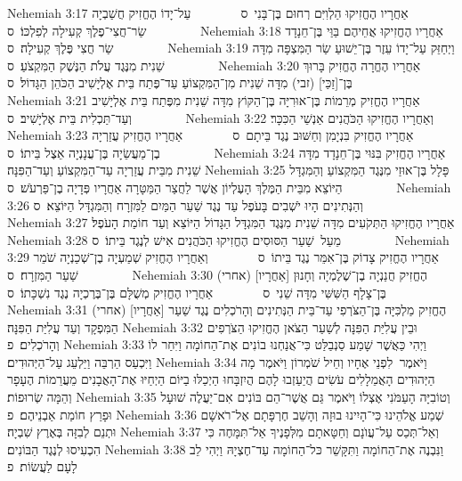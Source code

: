 Nehemiah 3:17	אַחֲרָיו הֶחֱזִיקוּ הַלְוִיִּם רְחוּם בֶּן־בָּנִי {ס}        עַל־יָדוֹ הֶחֱזִיק חֲשַׁבְיָה שַׂר־חֲצִי־פֶלֶךְ קְעִילָה לְפִלְכּוֹ׃ {ס}        
Nehemiah 3:18	אַחֲרָיו הֶחֱזִיקוּ אֲחֵיהֶם בַּוַּי בֶּן־חֵנָדָד שַׂר חֲצִי פֶּלֶךְ קְעִילָה׃ {ס}        
Nehemiah 3:19	וַיְחַזֵּק עַל־יָדוֹ עֵזֶר בֶּן־יֵשׁוּעַ שַׂר הַמִּצְפָּה מִדָּה שֵׁנִית מִנֶּגֶד עֲלֹת הַנֶּשֶׁק הַמִּקְצֹעַ׃ {ס}        
Nehemiah 3:20	אַחֲרָיו הֶחֱרָה הֶחֱזִיק בָּרוּךְ בֶּן־[זַכַּי] (זבי) מִדָּה שֵׁנִית מִן־הַמִּקְצוֹעַ עַד־פֶּתַח בֵּית אֶלְיָשִׁיב הַכֹּהֵן הַגָּדוֹל׃ {ס}        
Nehemiah 3:21	אַחֲרָיו הֶחֱזִיק מְרֵמוֹת בֶּן־אוּרִיָּה בֶּן־הַקּוֹץ מִדָּה שֵׁנִית מִפֶּתַח בֵּית אֶלְיָשִׁיב וְעַד־תַּכְלִית בֵּית אֶלְיָשִׁיב׃ {ס}        
Nehemiah 3:22	וְאַחֲרָיו הֶחֱזִיקוּ הַכֹּהֲנִים אַנְשֵׁי הַכִּכָּר׃
Nehemiah 3:23	אַחֲרָיו הֶחֱזִיק בִּנְיָמִן וְחַשּׁוּב נֶגֶד בֵּיתָם {ס}        אַחֲרָיו הֶחֱזִיק עֲזַרְיָה בֶן־מַעֲשֵׂיָה בֶּן־עֲנָנְיָה אֵצֶל בֵּיתוֹ׃ {ס}        
Nehemiah 3:24	אַחֲרָיו הֶחֱזִיק בִּנּוּי בֶּן־חֵנָדָד מִדָּה שֵׁנִית מִבֵּית עֲזַרְיָה עַד־הַמִּקְצוֹעַ וְעַד־הַפִּנָּה׃
Nehemiah 3:25	פָּלָל בֶּן־אוּזַי מִנֶּגֶד הַמִּקְצוֹעַ וְהַמִּגְדָּל הַיּוֹצֵא מִבֵּית הַמֶּלֶךְ הָעֶלְיוֹן אֲשֶׁר לַחֲצַר הַמַּטָּרָה אַחֲרָיו פְּדָיָה בֶן־פַּרְעֹשׁ׃ {ס}        
Nehemiah 3:26	וְהַנְּתִינִים הָיוּ יֹשְׁבִים בָּעֹפֶל עַד נֶגֶד שַׁעַר הַמַּיִם לַמִּזְרָח וְהַמִּגְדָּל הַיּוֹצֵא׃ {ס}        
Nehemiah 3:27	אַחֲרָיו הֶחֱזִיקוּ הַתְּקֹעִים מִדָּה שֵׁנִית מִנֶּגֶד הַמִּגְדָּל הַגָּדוֹל הַיּוֹצֵא וְעַד חוֹמַת הָעֹפֶל׃
Nehemiah 3:28	מֵעַל  שַׁעַר הַסּוּסִים הֶחֱזִיקוּ הַכֹּהֲנִים אִישׁ לְנֶגֶד בֵּיתוֹ׃ {ס}        
Nehemiah 3:29	אַחֲרָיו הֶחֱזִיק צָדוֹק בֶּן־אִמֵּר נֶגֶד בֵּיתוֹ {ס}        וְאַחֲרָיו הֶחֱזִיק שְׁמַעְיָה בֶן־שְׁכַנְיָה שֹׁמֵר שַׁעַר הַמִּזְרָח׃ {ס}        
Nehemiah 3:30	(אחרי) [אַחֲרָיו] הֶחֱזִיק חֲנַנְיָה בֶן־שֶׁלֶמְיָה וְחָנוּן בֶּן־צָלָף הַשִּׁשִּׁי מִדָּה שֵׁנִי {ס}        אַחֲרָיו הֶחֱזִיק מְשֻׁלָּם בֶּן־בֶּרֶכְיָה נֶגֶד נִשְׁכָּתוֹ׃ {ס}        
Nehemiah 3:31	(אחרי) [אַחֲרָיו] הֶחֱזִיק מַלְכִּיָּה בֶּן־הַצֹּרְפִי עַד־בֵּית הַנְּתִינִים וְהָרֹכְלִים נֶגֶד שַׁעַר הַמִּפְקָד וְעַד עֲלִיַּת הַפִּנָּה׃
Nehemiah 3:32	וּבֵין עֲלִיַּת הַפִּנָּה לְשַׁעַר הַצֹּאן הֶחֱזִיקוּ הַצֹּרְפִים וְהָרֹכְלִים׃ {פ}
Nehemiah 3:33	וַיְהִי כַּאֲשֶׁר שָׁמַע סַנְבַלַּט כִּי־אֲנַחְנוּ בוֹנִים אֶת־הַחוֹמָה וַיִּחַר לוֹ וַיִּכְעַס הַרְבֵּה וַיַּלְעֵג עַל־הַיְּהוּדִים׃
Nehemiah 3:34	וַיֹּאמֶר  לִפְנֵי אֶחָיו וְחֵיל שֹׁמְרוֹן וַיֹּאמֶר מָה הַיְּהוּדִים הָאֲמֵלָלִים עֹשִׂים הֲיַעַזְבוּ לָהֶם הֲיִזְבָּחוּ הַיְכַלּוּ בַיּוֹם הַיְחַיּוּ אֶת־הָאֲבָנִים מֵעֲרֵמוֹת הֶעָפָר וְהֵמָּה שְׂרוּפוֹת׃
Nehemiah 3:35	וְטוֹבִיָּה הָעַמֹּנִי אֶצְלוֹ וַיֹּאמֶר גַּם אֲשֶׁר־הֵם בּוֹנִים אִם־יַעֲלֶה שׁוּעָל וּפָרַץ חוֹמַת אַבְנֵיהֶם׃ {פ}
Nehemiah 3:36	שְׁמַע אֱלֹהֵינוּ כִּי־הָיִינוּ בוּזָה וְהָשֵׁב חֶרְפָּתָם אֶל־רֹאשָׁם וּתְנֵם לְבִזָּה בְּאֶרֶץ שִׁבְיָה׃
Nehemiah 3:37	וְאַל־תְּכַס עַל־עֲוֺנָם וְחַטָּאתָם מִלְּפָנֶיךָ אַל־תִּמָּחֶה כִּי הִכְעִיסוּ לְנֶגֶד הַבּוֹנִים׃
Nehemiah 3:38	וַנִּבְנֶה אֶת־הַחוֹמָה וַתִּקָּשֵׁר כּל־הַחוֹמָה עַד־חֶצְיָהּ וַיְהִי לֵב לָעָם לַעֲשׂוֹת׃ {פ}
